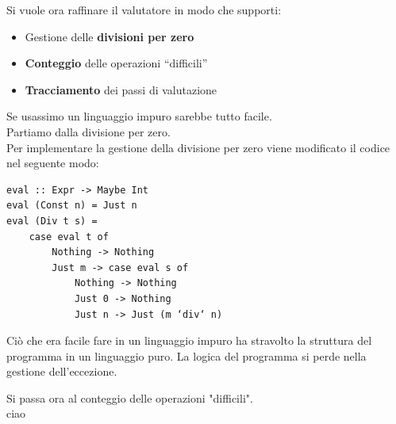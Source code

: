 \documentclass{article}
\begin{document}
Si vuole ora raffinare il valutatore in modo che supporti:
\begin{itemize}
    \item Gestione delle \textbf{divisioni per zero}
    \item \textbf{Conteggio} delle operazioni “difficili”
    \item \textbf{Tracciamento} dei passi di valutazione
\end{itemize}
Se usassimo un linguaggio impuro sarebbe tutto facile.\vspace{14pt}\\
Partiamo dalla divisione per zero.\\
Per implementare la gestione della divisione per zero viene modificato il codice nel seguente modo:
\begin{tcolorbox}
\begin{verbatim}
eval :: Expr -> Maybe Int
eval (Const n) = Just n
eval (Div t s) =
    case eval t of
        Nothing -> Nothing
        Just m -> case eval s of
            Nothing -> Nothing
            Just 0 -> Nothing
            Just n -> Just (m ‘div‘ n)
\end{verbatim}
\end{tcolorbox}
Ciò che era facile fare in un linguaggio impuro ha stravolto la struttura del programma in un linguaggio puro. La logica del programma si perde nella gestione dell’eccezione.

Si passa ora al conteggio delle operazioni "difficili".\\
ciao
\end{document}
